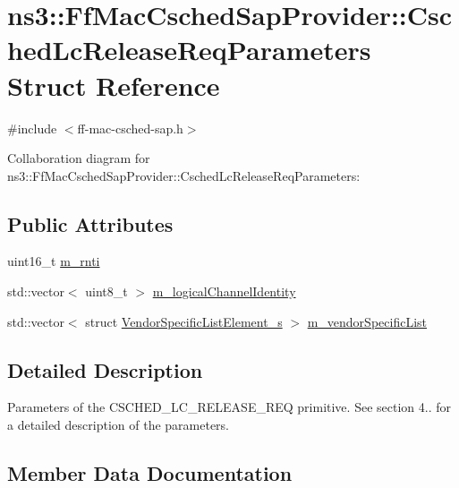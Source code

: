 \hypertarget{structns3_1_1FfMacCschedSapProvider_1_1CschedLcReleaseReqParameters}{}\section{ns3\+:\+:Ff\+Mac\+Csched\+Sap\+Provider\+:\+:Csched\+Lc\+Release\+Req\+Parameters Struct Reference}
\label{structns3_1_1FfMacCschedSapProvider_1_1CschedLcReleaseReqParameters}


{\ttfamily \#include $<$ff-\/mac-\/csched-\/sap.\+h$>$}



Collaboration diagram for ns3\+:\+:Ff\+Mac\+Csched\+Sap\+Provider\+:\+:Csched\+Lc\+Release\+Req\+Parameters\+:
\subsection*{Public Attributes}
\begin{DoxyCompactItemize}
\item 
uint16\+\_\+t \hyperlink{structns3_1_1FfMacCschedSapProvider_1_1CschedLcReleaseReqParameters_a7485bc62a1c7ea64d927b2cc1673c9ef}{m\+\_\+rnti}
\item 
std\+::vector$<$ uint8\+\_\+t $>$ \hyperlink{structns3_1_1FfMacCschedSapProvider_1_1CschedLcReleaseReqParameters_aa66207369a8c82bc737b2274e12019a1}{m\+\_\+logical\+Channel\+Identity}
\item 
std\+::vector$<$ struct \hyperlink{structns3_1_1VendorSpecificListElement__s}{Vendor\+Specific\+List\+Element\+\_\+s} $>$ \hyperlink{structns3_1_1FfMacCschedSapProvider_1_1CschedLcReleaseReqParameters_a9b62e97cd837b4c0f824aed134d2db20}{m\+\_\+vendor\+Specific\+List}
\end{DoxyCompactItemize}


\subsection{Detailed Description}
Parameters of the C\+S\+C\+H\+E\+D\+\_\+\+L\+C\+\_\+\+R\+E\+L\+E\+A\+S\+E\+\_\+\+R\+EQ primitive. See section 4.. for a detailed description of the parameters. 

\subsection{Member Data Documentation}
